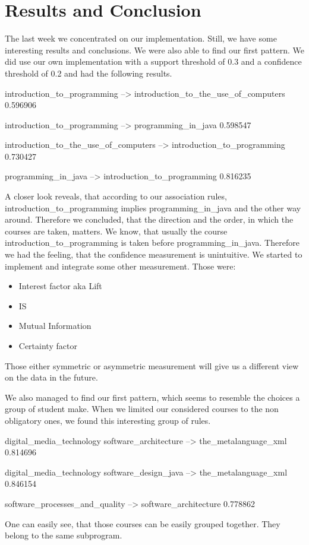 \section{Results and Conclusion}

The last week we concentrated on our implementation.
Still, we have some interesting results and conclusions. We were also able to find our first pattern.
\newline
We did use our own implementation with a support threshold of 0.3 and a confidence threshold of 0.2 and had the following results.
\newline


introduction\_to\_programming --> introduction\_to\_the\_use\_of\_computers 0.596906

introduction\_to\_programming --> programming\_in\_java 0.598547

introduction\_to\_the\_use\_of\_computers --> introduction\_to\_programming 0.730427

programming\_in\_java --> introduction\_to\_programming 0.816235
\newline

A closer look reveals, that according to our association rules, introduction\_to\_programming implies
programming\_in\_java and the other way around.
Therefore we concluded, that the direction and the order, in which the courses are taken, matters.
We know, that usually the course introduction\_to\_programming is taken before programming\_in\_java.
Therefore we had the feeling, that the confidence measurement is unintuitive.
We started to implement and integrate some other measurement.
Those were:
\begin{itemize}
 \item Interest factor aka Lift
\item IS
\item Mutual Information
\item Certainty factor
\end{itemize}

Those either symmetric or asymmetric measurement will give us a different view on the data in the future.
\newline

We also managed to find our first pattern, which seems to resemble the choices a group of student make.
When we limited our considered courses to the non obligatory ones, we found this interesting group of rules.
\newline


digital\_media\_technology software\_architecture --> the\_metalanguage\_xml 0.814696

digital\_media\_technology software\_design\_java --> the\_metalanguage\_xml 0.846154

software\_processes\_and\_quality --> software\_architecture 0.778862
\newline

One can easily see, that those courses can be easily grouped together. They belong to the same subprogram.
